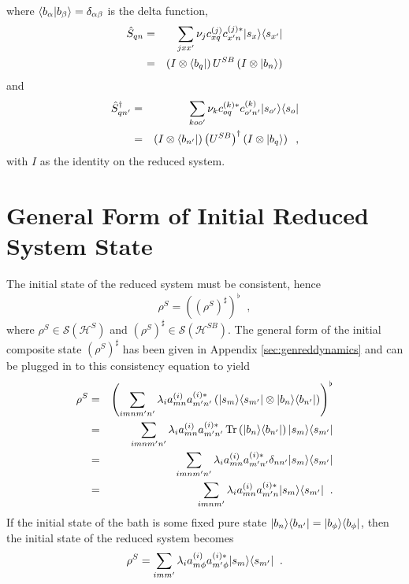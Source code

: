 where $\langle b_{\alpha}|b_\beta\rangle=\delta_{\alpha\beta}$ is the delta function,
\begin{eqnarray*}
\hat{S}_{qn} &=& \sum_{jxx^\prime} \nu_j c_{xq}^{(j)} c_{x^\prime n}^{(j)*} |s_x\rangle\langle s_{x^\prime}|\\
&=& \left( I\otimes \left\langle b_q\right|\right)U^{SB}\left(I\otimes \left|b_n\right\rangle\right)
\end{eqnarray*}
and
\begin{eqnarray*}
\hat{S}_{qn^\prime}^\dagger &=& \sum_{koo^\prime} \nu_k c_{oq}^{(k)*} c_{o^\prime n^\prime}^{(k)} |s_{o^\prime}\rangle\langle s_{o}|\\
&=& \left( I\otimes \left\langle b_{n^\prime}\right|\right)\left(U^{SB}\right)^\dagger\left(I\otimes \left|b_q\right\rangle\right)\;\;,
\end{eqnarray*}
with $I$ as the identity on the reduced system.

\section{General Form of Initial Reduced System State}
\label{sec:genredstate}

The initial state of the reduced system must be consistent, hence
$$
\rho^S = \left((\rho^S)^\sharp\right)^\flat\;\;,
$$
where $\rho^S\in\mathcal{S}(\mathcal{H}^S)$ and $(\rho^S)^\sharp\in\mathcal{S}(\mathcal{H}^{SB})$.  The general form of the initial composite state $(\rho^S)^\sharp$ has been given in Appendix \ref{sec:genreddynamics} and can be plugged in to this consistency equation to yield
\begin{eqnarray*}
\rho^S &=& \left(\sum_{imnm^\prime n^\prime} \lambda_i a_{mn}^{(i)}a_{m^\prime n^\prime}^{(i)*} \left(|s_m\rangle\langle s_{m^\prime}| \otimes |b_n\rangle\langle b_{n^\prime}|\right)\right)^\flat\\
&=& \sum_{imnm^\prime n^\prime} \lambda_i a_{mn}^{(i)}a_{m^\prime n^\prime}^{(i)*} \operatorname{Tr}\left(|b_n\rangle\langle b_{n^\prime}|\right)|s_m\rangle\langle s_{m^\prime}| \\
&=& \sum_{imnm^\prime n^\prime} \lambda_i a_{mn}^{(i)}a_{m^\prime n^\prime}^{(i)*} \delta_{nn^\prime}|s_m\rangle\langle s_{m^\prime}| \\
&=& \sum_{imnm^\prime} \lambda_i a_{mn}^{(i)}a_{m^\prime n}^{(i)*} |s_m\rangle\langle s_{m^\prime}| \;\;.
\end{eqnarray*}
If the initial state of the bath is some fixed pure state $|b_n\rangle\langle b_{n^\prime}|=|b_\phi\rangle\langle b_{\phi}|$, then the initial state of the reduced system becomes
$$
\rho^S = \sum_{imm^\prime} \lambda_i a_{m\phi}^{(i)}a_{m^\prime \phi}^{(i)*} |s_m\rangle\langle s_{m^\prime}|\;\;.
$$

